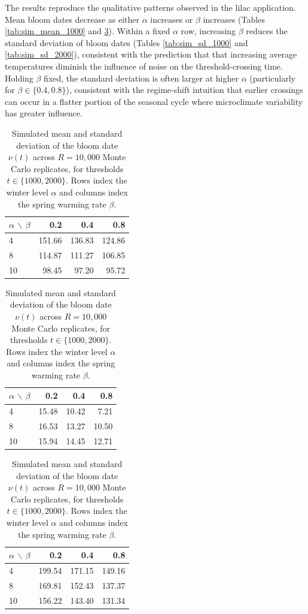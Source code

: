 \documentclass[
]{article}
\begin{document}
The results reproduce the qualitative patterns observed in the lilac
application. Mean bloom dates decrease as either
\(\alpha\) increases or \(\beta\) increases
(Tables \ref{tab:sim_mean_1000} and
\ref{tab:sim_mean_2000}). Within a fixed \(\alpha\) row, increasing
\(\beta\) reduces the standard deviation of bloom dates
(Tables \ref{tab:sim_sd_1000} and
\ref{tab:sim_sd_2000}), consistent with the prediction that
that increasing average temperatures diminish the influence of noise on the
threshold-crossing time. Holding \(\beta\) fixed, the standard deviation is often
larger at higher \(\alpha\) (particularly for \(\beta\in\{0.4,0.8\}\)),
consistent with the regime-shift intuition that earlier crossings can
occur in a flatter portion of the seasonal cycle where microclimate
variability has greater influence.

\begin{table}[t]
\centering
\caption{Simulated mean and standard deviation of the bloom date
$\nu(t)$ across $R=10{,}000$ Monte Carlo replicates, for thresholds $t\in\{1000,2000\}$. Rows index the winter
level $\alpha$ and columns index the spring warming rate $\beta$.}
\label{tab:sim_piecewise_all}

\setlength{\tabcolsep}{6pt}
\renewcommand{\arraystretch}{1.15}

\begin{minipage}{0.49\linewidth}
\centering
{}
\label{tab:sim_mean_1000}
\begin{tabular}{lrrr}
\toprule
$\alpha$ $\backslash$ $\beta$ & 0.2 & 0.4 & 0.8 \\
\midrule
4  & 151.66 & 136.83 & 124.86 \\
8  & 114.87 & 111.27 & 106.85 \\
10 &  98.45 &  97.20 &  95.72 \\
\bottomrule
\end{tabular}

\vspace{1.0em}

\label{tab:sim_sd_1000}
\begin{tabular}{lrrr}
\toprule
$\alpha$ $\backslash$ $\beta$ & 0.2 & 0.4 & 0.8 \\
\midrule
4  & 15.48 & 10.42 &  7.21 \\
8  & 16.53 & 13.27 & 10.50 \\
10 & 15.94 & 14.45 & 12.71 \\
\bottomrule
\end{tabular}
\end{minipage}
\hfill
\begin{minipage}{0.49\linewidth}
\centering
{}
\label{tab:sim_mean_2000}
\begin{tabular}{lrrr}
\toprule
$\alpha$ $\backslash$ $\beta$ & 0.2 & 0.4 & 0.8 \\
\midrule
4  & 199.54 & 171.15 & 149.16 \\
8  & 169.81 & 152.43 & 137.37 \\
10 & 156.22 & 143.40 & 131.34 \\
\bottomrule
\end{tabular}


\end{minipage}
\end{table}
\end{document}
